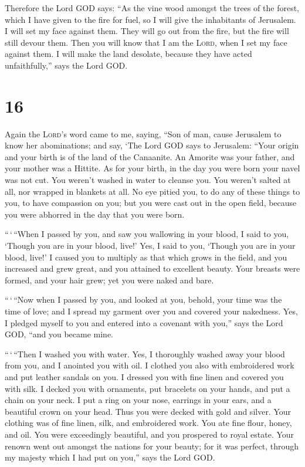  Therefore the Lord GOD says: ``As the vine wood amongst
the trees of the forest, which I have given to the fire for fuel, so I
will give the inhabitants of Jerusalem.  I will set my
face against them. They will go out from the fire, but the fire will
still devour them. Then you will know that I am the \textsc{Lord}, when
I set my face against them.  I will make the land
desolate, because they have acted unfaithfully,'' says the Lord GOD.

\hypertarget{section-15}{%
\section{16}\label{section-15}}

 Again the \textsc{Lord}'s word came to me, saying,
 ``Son of man, cause Jerusalem to know her abominations;
 and say, `The Lord GOD says to Jerusalem: ``Your origin
and your birth is of the land of the Canaanite. An Amorite was your
father, and your mother was a Hittite.  As for your birth,
in the day you were born your navel was not cut. You weren't washed in
water to cleanse you. You weren't salted at all, nor wrapped in blankets
at all.  No eye pitied you, to do any of these things to
you, to have compassion on you; but you were cast out in the open field,
because you were abhorred in the day that you were born.

 ``\,`\,``When I passed by you, and saw you wallowing in
your blood, I said to you, `Though you are in your blood, live!' Yes, I
said to you, `Though you are in your blood, live!'  I
caused you to multiply as that which grows in the field, and you
increased and grew great, and you attained to excellent beauty. Your
breasts were formed, and your hair grew; yet you were naked and bare.

 ``\,`\,``Now when I passed by you, and looked at you,
behold, your time was the time of love; and I spread my garment over you
and covered your nakedness. Yes, I pledged myself to you and entered
into a covenant with you,'' says the Lord GOD, ``and you became mine.

 ``\,`\,``Then I washed you with water. Yes, I thoroughly
washed away your blood from you, and I anointed you with oil.
 I clothed you also with embroidered work and put leather
sandals on you. I dressed you with fine linen and covered you with silk.
 I decked you with ornaments, put bracelets on your
hands, and put a chain on your neck.  I put a ring on
your nose, earrings in your ears, and a beautiful crown on your head.
 Thus you were decked with gold and silver. Your clothing
was of fine linen, silk, and embroidered work. You ate fine flour,
honey, and oil. You were exceedingly beautiful, and you prospered to
royal estate.  Your renown went out amongst the nations
for your beauty; for it was perfect, through my majesty which I had put
on you,'' says the Lord GOD.

